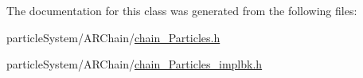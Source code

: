 The documentation for this class was generated from the following files\+:\begin{DoxyCompactItemize}
\item 
particle\+System/\+A\+R\+Chain/\mbox{\hyperlink{chain_particles_8h}{chain_\+Particles.\+h}}\item
particle\+System/\+A\+R\+Chain/\mbox{\hyperlink{chain_particles__implbk_8h}{chain_\+Particles\+\_\+implbk.\+h}}\end{DoxyCompactItemize}
